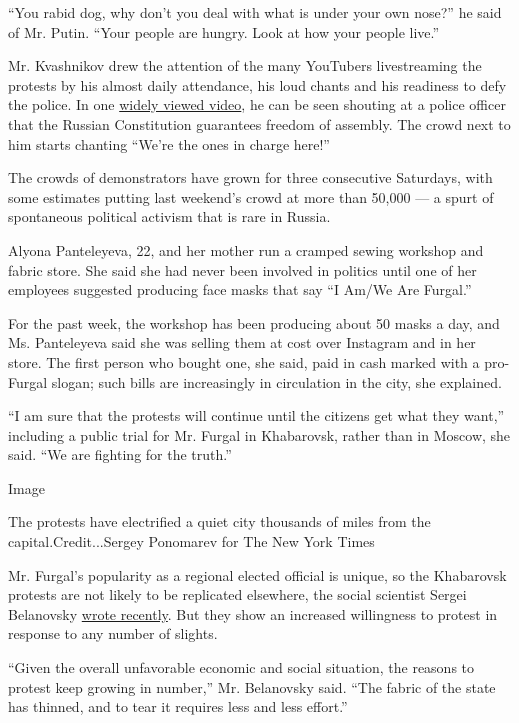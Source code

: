 ``You rabid dog, why don't you deal with what is under your own nose?''
he said of Mr. Putin. ``Your people are hungry. Look at how your people
live.''

Mr. Kvashnikov drew the attention of the many YouTubers livestreaming
the protests by his almost daily attendance, his loud chants and his
readiness to defy the police. In one
\href{https://www.youtube.com/watch?v=NxQxQICbcTU}{widely viewed video},
he can be seen shouting at a police officer that the Russian
Constitution guarantees freedom of assembly. The crowd next to him
starts chanting ``We're the ones in charge here!''

The crowds of demonstrators have grown for three consecutive Saturdays,
with some estimates putting last weekend's crowd at more than 50,000 ---
a spurt of spontaneous political activism that is rare in Russia.

Alyona Panteleyeva, 22, and her mother run a cramped sewing workshop and
fabric store. She said she had never been involved in politics until one
of her employees suggested producing face masks that say ``I Am/We Are
Furgal.''

For the past week, the workshop has been producing about 50 masks a day,
and Ms. Panteleyeva said she was selling them at cost over Instagram and
in her store. The first person who bought one, she said, paid in cash
marked with a pro-Furgal slogan; such bills are increasingly in
circulation in the city, she explained.

``I am sure that the protests will continue until the citizens get what
they want,'' including a public trial for Mr. Furgal in Khabarovsk,
rather than in Moscow, she said. ``We are fighting for the truth.''

Image

The protests have electrified a quiet city thousands of miles from the
capital.Credit...Sergey Ponomarev for The New York Times

Mr. Furgal's popularity as a regional elected official is unique, so the
Khabarovsk protests are not likely to be replicated elsewhere, the
social scientist Sergei Belanovsky
\href{https://theins.ru/opinions/belanovsky/narodnyi-gubernator}{wrote
recently}. But they show an increased willingness to protest in response
to any number of slights.

``Given the overall unfavorable economic and social situation, the
reasons to protest keep growing in number,'' Mr. Belanovsky said. ``The
fabric of the state has thinned, and to tear it requires less and less
effort.''

